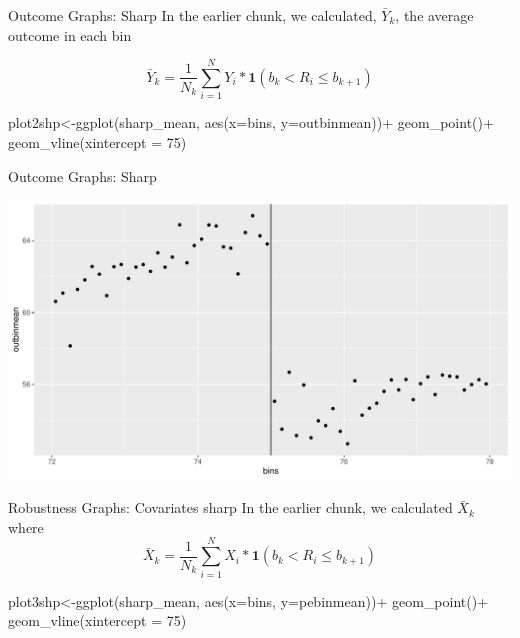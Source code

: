 \documentclass[
  ignorenonframetext,
]{beamer}
\newenvironment{Shaded}{\begin{snugshade}}{\end{snugshade}}
\newcommand{\AttributeTok}[1]{\textcolor[rgb]{0.77,0.63,0.00}{#1}}
\newcommand{\DecValTok}[1]{\textcolor[rgb]{0.00,0.00,0.81}{#1}}
\newcommand{\FunctionTok}[1]{\textcolor[rgb]{0.00,0.00,0.00}{#1}}
\newcommand{\NormalTok}[1]{#1}
\newcommand{\OtherTok}[1]{\textcolor[rgb]{0.56,0.35,0.01}{#1}}
\newcommand{\SpecialCharTok}[1]{\textcolor[rgb]{0.00,0.00,0.00}{#1}}
\begin{document}
\begin{frame}[fragile]{Outcome Graphs: Sharp}
\protect\hypertarget{outcome-graphs-sharp}{}
In the earlier chunk, we calculated, \(\bar{Y}_k\), the average outcome
in each bin

\[
\bar{Y}_k=\frac{1}{N_k}\sum_{i=1}^NY_i*\mathbf{1}(b_k<R_i\leq b_{k+1})
\] \tiny

\begin{Shaded}
\begin{Highlighting}[]
\NormalTok{plot2shp}\OtherTok{\textless{}{-}}\FunctionTok{ggplot}\NormalTok{(sharp\_mean, }\FunctionTok{aes}\NormalTok{(}\AttributeTok{x=}\NormalTok{bins, }\AttributeTok{y=}\NormalTok{outbinmean))}\SpecialCharTok{+} 
         \FunctionTok{geom\_point}\NormalTok{()}\SpecialCharTok{+}
         \FunctionTok{geom\_vline}\NormalTok{(}\AttributeTok{xintercept =} \DecValTok{75}\NormalTok{)}
\end{Highlighting}
\end{Shaded}
\end{frame}

\begin{frame}{Outcome Graphs: Sharp}
\protect\hypertarget{outcome-graphs-sharp-1}{}
\tiny

\includegraphics{Slides9_RD_files/figure-beamer/sharp3b-1.pdf}
\end{frame}

\begin{frame}[fragile]{Robustness Graphs: Covariates sharp}
\protect\hypertarget{robustness-graphs-covariates-sharp}{}
In the earlier chunk, we calculated \(\bar{X}_k\) where \[
\bar{X}_k=\frac{1}{N_k}\sum_{i=1}^NX_i*\mathbf{1}(b_k<R_i\leq b_{k+1})
\]

\tiny

\begin{Shaded}
\begin{Highlighting}[]
\NormalTok{plot3shp}\OtherTok{\textless{}{-}}\FunctionTok{ggplot}\NormalTok{(sharp\_mean, }\FunctionTok{aes}\NormalTok{(}\AttributeTok{x=}\NormalTok{bins, }\AttributeTok{y=}\NormalTok{pebinmean))}\SpecialCharTok{+} 
         \FunctionTok{geom\_point}\NormalTok{()}\SpecialCharTok{+}
         \FunctionTok{geom\_vline}\NormalTok{(}\AttributeTok{xintercept =} \DecValTok{75}\NormalTok{)}
\end{Highlighting}
\end{Shaded}
\end{frame}
\end{document}

